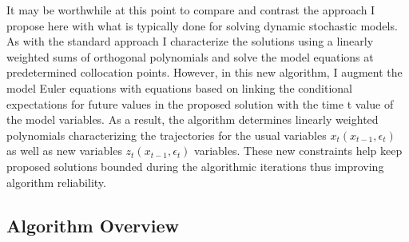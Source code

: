 \documentclass[12pt]{article}
\begin{document}
It may be worthwhile at this point
to compare and contrast the approach I propose here with 
what is typically done for solving dynamic stochastic models.
As with the standard approach I characterize the solutions using a linearly
weighted sums of orthogonal polynomials and solve the model equations
at predetermined collocation points. However, in this new algorithm, I 
augment the model Euler equations with equations based on 
  linking the conditional expectations for future values in
the proposed solution with the
time t value of the model variables.  As a result, the algorithm determines
linearly weighted polynomials characterizing the 
trajectories for the usual
variables $x_t(x_{t-1},\epsilon_t)$ as well as new variables $z_t(x_{t-1},\epsilon_t)$ variables.  These new constraints 
help keep proposed solutions bounded during the algorithmic iterations 
thus improving algorithm reliability.






\subsection{Algorithm Overview}

\end{document}
